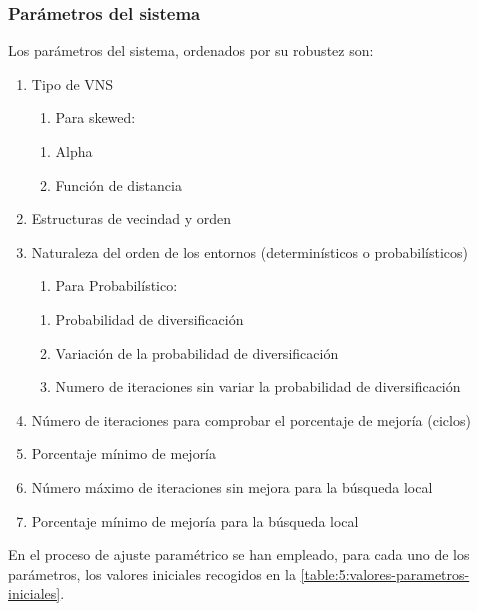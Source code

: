 \subsubsection{Parámetros del sistema} \label{sec:5:parametros-sistema}
Los parámetros del sistema, ordenados por su robustez son:
\begin{enumerate}
	\item Tipo de VNS
	\begin{enumerate}[label={},left=-1pt]
		\item Para skewed:
	\end{enumerate}
	\begin{enumerate}[label*={\arabic*}]
		\item Alpha
		\item Función de distancia 
	\end{enumerate}
	\item Estructuras de vecindad y orden
	\item Naturaleza del orden de los entornos (determinísticos o probabilísticos)
	\begin{enumerate}[label={},left=-1pt]
		\item Para Probabilístico:
	\end{enumerate}
	\begin{enumerate}[label*={\arabic*}]
		\item Probabilidad de diversificación
		\item Variación de la probabilidad de diversificación 
		\item Numero de iteraciones sin variar la probabilidad de diversificación 
	\end{enumerate}
	\item Número de iteraciones para comprobar el porcentaje de mejoría (ciclos)
	\item Porcentaje mínimo de mejoría
	\item Número máximo de iteraciones sin mejora para la búsqueda local
	\item Porcentaje mínimo de mejoría para la búsqueda local
\end{enumerate}

En el proceso de ajuste paramétrico se han empleado, para cada uno de los parámetros, los valores iniciales recogidos en la \autoref{table:5:valores-parametros-iniciales}.

